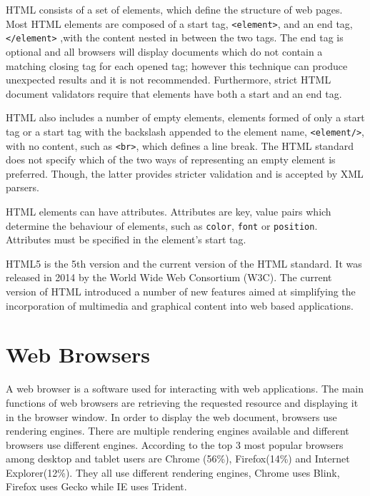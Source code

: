 \documentclass[10pt,a4paper,twoside]{book}
\begin{document}
HTML consists of a set of elements, which define the structure of web pages. Most HTML elements are composed of a start tag, \texttt{<element>}, and an end tag, \texttt{</element>} ,with the content nested in between the two tags. The end tag is optional and all browsers will display documents which do not contain a matching closing tag for each opened tag; however this technique can produce unexpected results and it is not recommended. Furthermore, strict HTML document validators require that elements have both a start and an end tag. \cite{world1999html}

HTML also includes a number of empty elements, elements formed of only a start tag or a start tag with the backslash appended to the element name, \texttt{<element/>}, with no content, such as \texttt{<br>}, which defines a line break. The HTML standard does not specify which of the two ways of representing an empty element is preferred. Though, the latter provides stricter validation and is accepted by XML parsers. \cite{world1999html}

HTML elements can have attributes. Attributes are key, value pairs which determine the behaviour of elements, such as \texttt{color}, \texttt{font} or \texttt{position}. Attributes must be specified in the element's start tag. \cite{world1999html}

HTML5 is the 5th version and the current version of the HTML standard. It was released in 2014 by the World Wide Web Consortium (W3C). The current version of HTML introduced a number of new features aimed at simplifying the incorporation of multimedia and graphical content into web based applications. \cite{berjon2014html}

\section{Web Browsers}

A web browser is a software used for interacting with web applications. The main functions of web browsers are retrieving the requested resource and displaying it in the browser window. In order to display the web document, browsers use rendering engines. There are multiple rendering engines available and different browsers use different engines. According to \cite{statcounter} the top 3 most popular browsers among desktop and tablet users are Chrome (56\%), Firefox(14\%) and Internet Explorer(12\%). They all use different rendering engines, Chrome uses Blink, Firefox uses Gecko while IE uses Trident.\cite{howbrowserswork}
\end{document}
